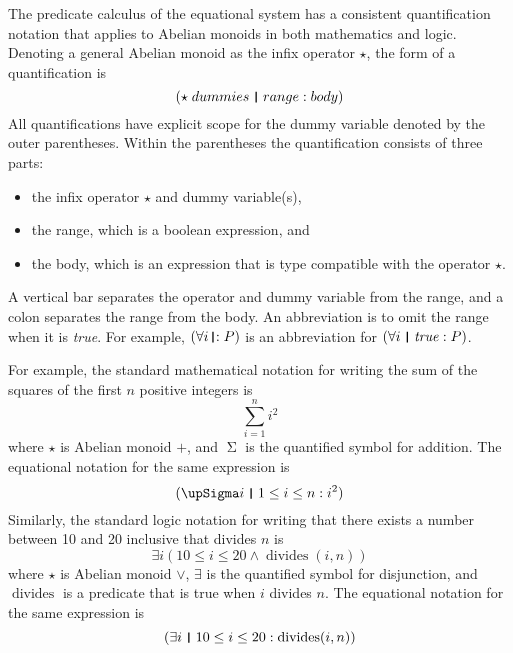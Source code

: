 \documentclass[12pt, fleqn, leqno]{article}
\DeclareMathOperator{\divides}{divides}
\newcommand{\thedr}{\rule[-.25ex]{.32mm}{1.75ex}}   %
\newcommand{\dr}{\;\,\thedr\,\;}                    %
\newcommand{\rb}{:}                                 %
\newcommand{\drrb}{\;\thedr\,{:}\;}                 %
\newcommand{\all}{\forall}                          %
\newcommand{\ext}{\exists}                          %
\begin{document}
The predicate calculus of the equational system has a consistent quantification notation that applies to Abelian monoids in both mathematics and logic.
Denoting a general Abelian monoid as the infix operator $\star$, the form of a quantification is
\[
(\star\; dummies\dr range\rb body)
\]
All quantifications have explicit scope for the dummy variable denoted by the outer parentheses.
Within the parentheses the quantification consists of three parts:
\begin{itemize}
\item the infix operator $\star$ and dummy variable(s),
\item the range, which is a boolean expression, and
\item the body, which is an expression that is type compatible with the operator $\star$.
\end{itemize}
A vertical bar separates the operator and dummy variable from the range, and a colon separates the range from the body.
An abbreviation is to omit the range when it is \textit{true}.
For example, $(\all i\drrb P)$ is an abbreviation for $(\all i\dr \mathit{true} \rb P)$.

For example, the standard mathematical notation for writing the sum of the squares of the first $n$ positive integers is
\[
\sum_{i=1}^{n}i^2
\]
where $\star$ is Abelian monoid $+$, and $\upSigma$ is the quantified symbol for addition.
The equational notation for the same expression is
\[
(\upSigma i\dr 1\le i\le n \rb i^2)
\]
Similarly, the standard logic notation for writing that there exists a number between 10 and 20 inclusive that divides $n$ is
\[
\ext i(10\le i\le 20 \land \divides(i,n))
\]
where $\star$ is Abelian monoid $\lor$, $\ext$ is the quantified symbol for disjunction, and $\divides$ is a predicate that is true when $i$ divides $n$.
The equational notation for the same expression is
\[
(\ext i\dr 10\le i\le 20 \rb \divides(i,n))
\]
\end{document}
